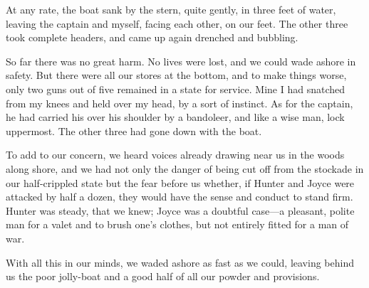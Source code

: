 At any rate, the boat sank by the stern, quite gently, in three feet of water, leaving the captain and myself, facing each other, on our feet. The other three took complete headers, and came up again drenched and bubbling.

So far there was no great harm. No lives were lost, and we could wade ashore in safety. But there were all our stores at the bottom, and to make things worse, only two guns out of five remained in a state for service. Mine I had snatched from my knees and held over my head, by a sort of instinct. As for the captain, he had carried his over his shoulder by a bandoleer, and like a wise man, lock uppermost. The other three had gone down with the boat.

To add to our concern, we heard voices already drawing near us in the woods along shore, and we had not only the danger of being cut off from the stockade in our half-crippled state but the fear before us whether, if Hunter and Joyce were attacked by half a dozen, they would have the sense and conduct to stand firm. Hunter was steady, that we knew; Joyce was a doubtful case—a pleasant, polite man for a valet and to brush one's clothes, but not entirely fitted for a man of war.

With all this in our minds, we waded ashore as fast as we could, leaving behind us the poor jolly-boat and a good half of all our powder and provisions.